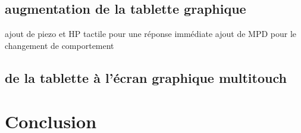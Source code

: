 \subsection{augmentation de la tablette graphique}
ajout de piezo et HP tactile pour une réponse immédiate
ajout de MPD pour le changement de comportement

\subsection{de la tablette à l'écran graphique multitouch}


\section{Conclusion}
\label{sec:interfaces:conclusion}
